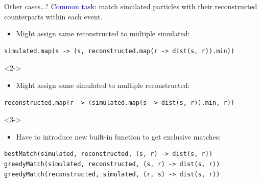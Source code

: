 \documentclass{beamer}
\begin{document}
\begin{frame}[fragile]{Other cases\ldots?}
\vspace{0.5 cm}
\textcolor{darkblue}{Common task:} match simulated particles with their reconstructed counterparts within each event.

\vspace{0.25 cm}
\begin{itemize}
\item Might assign same reconstructed to multiple simulated:
\end{itemize}
\begin{lstlisting}
simulated.map(s -> (s, reconstructed.map(r -> dist(s, r)).min))
\end{lstlisting}

\vspace{0.25 cm}
\begin{uncoverenv}<2->
\begin{itemize}
\item Might assign same simulated to multiple reconstructed:
\end{itemize}
\begin{lstlisting}
reconstructed.map(r -> (simulated.map(s -> dist(s, r)).min, r))
\end{lstlisting}
\end{uncoverenv}

\vspace{0.25 cm}
\begin{uncoverenv}<3->
\begin{itemize}
\item Have to introduce new built-in function to get exclusive matches:
\end{itemize}
\begin{lstlisting}
bestMatch(simulated, reconstructed, (s, r) -> dist(s, r))
greedyMatch(simulated, reconstructed, (s, r) -> dist(s, r))
greedyMatch(reconstructed, simulated, (r, s) -> dist(s, r))
\end{lstlisting}
\end{uncoverenv}
\end{frame}
\end{document}
